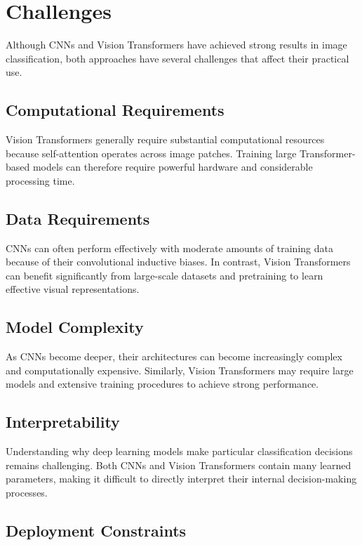 \documentclass[conference]{IEEEtran}
\begin{document}
\section{Challenges}

Although CNNs and Vision Transformers have achieved strong results in image classification, both approaches have several challenges that affect their practical use.

\subsection{Computational Requirements}

Vision Transformers generally require substantial computational resources because self-attention operates across image patches. Training large Transformer-based models can therefore require powerful hardware and considerable processing time.

\subsection{Data Requirements}

CNNs can often perform effectively with moderate amounts of training data because of their convolutional inductive biases. In contrast, Vision Transformers can benefit significantly from large-scale datasets and pretraining to learn effective visual representations.

\subsection{Model Complexity}

As CNNs become deeper, their architectures can become increasingly complex and computationally expensive. Similarly, Vision Transformers may require large models and extensive training procedures to achieve strong performance.

\subsection{Interpretability}

Understanding why deep learning models make particular classification decisions remains challenging. Both CNNs and Vision Transformers contain many learned parameters, making it difficult to directly interpret their internal decision-making processes.

\subsection{Deployment Constraints}
\end{document}
